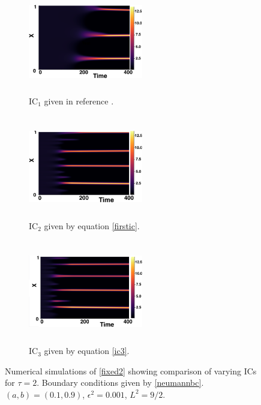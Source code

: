 \begin{figure}[H]
    \centering
    \begin{subfigure}[t]{0.32\textwidth}
        \centering
        \includegraphics[width=5cm,height=4.5cm]{gaff2.png}
        \caption{$\text{IC}_1$ given in reference \cite{gaffmonk}.}
        \label{}
    \end{subfigure}
    \hfill
    \begin{subfigure}[t]{0.32\textwidth}
        \centering
        \includegraphics[width=5cm,height=4.5cm]{ic22.png}
        \caption{$\text{IC}_2$ given by equation \eqref{firstic}.}
        \label{}
    \end{subfigure}
    \hfill
    \begin{subfigure}[t]{0.32\textwidth}
        \centering
        \includegraphics[width=5cm,height=4.5cm]{ic32.png}
        \caption{$\text{IC}_3$ given by equation \eqref{ic3}.}
        \label{}
    \end{subfigure}
    \caption{Numerical simulations of \eqref{fixed2} showing comparison of varying ICs for $\tau=2$. Boundary conditions given by \eqref{neumannbc}. $(a,b)=(0.1,0.9)$, $\epsilon^2=0.001$, $L^2=9/2$.}
    \label{fig:figtau2}
\end{figure}
